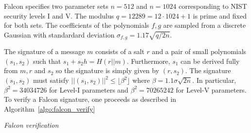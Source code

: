 Falcon specifies two parameter sets $n = 512$ and $n = 1024$ corresponding to NIST security levels I and V.  The modulus 
$q = 12289 = 12 \cdot 1024 + 1$ is prime and fixed for both sets.  The coefficients of the polynomials $f,g$ are sampled
from a discrete Gaussian with standardard deviation $\sigma_{f,g} = 1.17 \sqrt{q/2n}$.

The signature of a message $m$ consists of a salt $r$ and a pair of small polynomials $(s_1, s_2)$ such that 
$s_1 + s_2 h = H(r || m)$.  Furthermore, $s_1$ can be derived fully from $m , r$ and $s_2$ so the signature
is simply given by $(r, s_2)$.  The signature $(s_1,s_2)$ must satisfy $||(s_1,s_2)||^2 \leq \lfloor \beta^2 \rfloor$ where
$\beta = 1.1 \sigma \sqrt{2n}$.  In particular, $\beta^2 = 34034726$ for Level-I parameters and $\beta^2 = 70265242$
for Level-V parameters.  To verify a Falcon signature, one proceeds as described in Algorithm~\ref{algo:falcon_verify}

\begin{algorithm}[!ht] \label{algo:falcon_verify}
\begin{scriptsize}
\caption{\emph{Falcon verification}}
\end{scriptsize}
\end{algorithm} 
